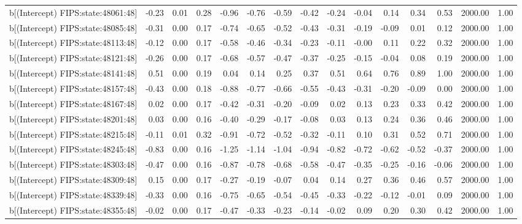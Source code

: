 \begin{table}[ht]
\begin{tabular}{rrrrrrrrrrrrrrr}
  b[(Intercept) FIPS:state:48061:48] & -0.23 & 0.01 & 0.28 & -0.96 & -0.76 & -0.59 & -0.42 & -0.24 & -0.04 & 0.14 & 0.34 & 0.53 & 2000.00 & 1.00 \\ 
  b[(Intercept) FIPS:state:48085:48] & -0.31 & 0.00 & 0.17 & -0.74 & -0.65 & -0.52 & -0.43 & -0.31 & -0.19 & -0.09 & 0.01 & 0.12 & 2000.00 & 1.00 \\ 
  b[(Intercept) FIPS:state:48113:48] & -0.12 & 0.00 & 0.17 & -0.58 & -0.46 & -0.34 & -0.23 & -0.11 & -0.00 & 0.11 & 0.22 & 0.32 & 2000.00 & 1.00 \\ 
  b[(Intercept) FIPS:state:48121:48] & -0.26 & 0.00 & 0.17 & -0.68 & -0.57 & -0.47 & -0.37 & -0.25 & -0.15 & -0.04 & 0.08 & 0.19 & 2000.00 & 1.00 \\ 
  b[(Intercept) FIPS:state:48141:48] & 0.51 & 0.00 & 0.19 & 0.04 & 0.14 & 0.25 & 0.37 & 0.51 & 0.64 & 0.76 & 0.89 & 1.00 & 2000.00 & 1.00 \\ 
  b[(Intercept) FIPS:state:48157:48] & -0.43 & 0.00 & 0.18 & -0.88 & -0.77 & -0.66 & -0.55 & -0.43 & -0.31 & -0.20 & -0.09 & 0.00 & 2000.00 & 1.00 \\ 
  b[(Intercept) FIPS:state:48167:48] & 0.02 & 0.00 & 0.17 & -0.42 & -0.31 & -0.20 & -0.09 & 0.02 & 0.13 & 0.23 & 0.33 & 0.42 & 2000.00 & 1.00 \\ 
  b[(Intercept) FIPS:state:48201:48] & 0.03 & 0.00 & 0.16 & -0.40 & -0.29 & -0.17 & -0.08 & 0.03 & 0.13 & 0.24 & 0.36 & 0.46 & 2000.00 & 1.00 \\ 
  b[(Intercept) FIPS:state:48215:48] & -0.11 & 0.01 & 0.32 & -0.91 & -0.72 & -0.52 & -0.32 & -0.11 & 0.10 & 0.31 & 0.52 & 0.71 & 2000.00 & 1.00 \\ 
  b[(Intercept) FIPS:state:48245:48] & -0.83 & 0.00 & 0.16 & -1.25 & -1.14 & -1.04 & -0.94 & -0.82 & -0.72 & -0.62 & -0.52 & -0.37 & 2000.00 & 1.00 \\ 
  b[(Intercept) FIPS:state:48303:48] & -0.47 & 0.00 & 0.16 & -0.87 & -0.78 & -0.68 & -0.58 & -0.47 & -0.35 & -0.25 & -0.16 & -0.06 & 2000.00 & 1.00 \\ 
  b[(Intercept) FIPS:state:48309:48] & 0.15 & 0.00 & 0.17 & -0.27 & -0.19 & -0.07 & 0.04 & 0.14 & 0.27 & 0.36 & 0.46 & 0.57 & 2000.00 & 1.00 \\ 
  b[(Intercept) FIPS:state:48339:48] & -0.33 & 0.00 & 0.16 & -0.75 & -0.65 & -0.54 & -0.45 & -0.33 & -0.22 & -0.12 & -0.01 & 0.09 & 2000.00 & 1.00 \\ 
  b[(Intercept) FIPS:state:48355:48] & -0.02 & 0.00 & 0.17 & -0.47 & -0.33 & -0.23 & -0.14 & -0.02 & 0.09 & 0.20 & 0.30 & 0.42 & 2000.00 & 1.00 \\ 

\end{tabular}
\end{table}
